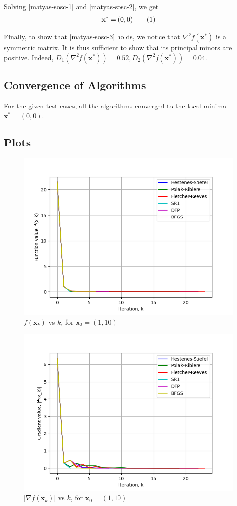 \documentclass[a4paper]{article}
\newcommand\numberthis{\addtocounter{equation}{1}\tag{\theequation}}
\begin{document}
Solving \eqref{matyas-sosc-1} and \eqref{matyas-sosc-2}, we get
\begin{align*}
    \textbf{x}^* = (0, 0) \numberthis \label{matyas-sosc-4}
\end{align*}

Finally, to show that \eqref{matyas-sosc-3} holds, we notice that $\nabla^2 f(\textbf{x}^*)$ is a symmetric matrix. It is thus sufficient to show that its principal minors are positive. Indeed, $D_1(\nabla^2 f(\textbf{x}^*)) = 0.52, D_2(\nabla^2 f(\textbf{x}^*)) = 0.04$.

\subsection{Convergence of Algorithms}

For the given test cases, all the algorithms converged to the local minima $\textbf{x}^* = (0, 0)$.

\subsection{Plots}

\begin{figure}[H]
    \centering
    \includegraphics[width=.65\textwidth]{matyas_function_vals.png}
    \caption{$f(\textbf{x}_k)$ vs $k$, for $\textbf{x}_0 = (1, 10)$}
\end{figure}

\begin{figure}[H]
    \centering
    \includegraphics[width=.65\textwidth]{matyas_function_grad.png}
    \caption{$|\nabla f(\textbf{x}_k)|$ vs $k$, for $\textbf{x}_0 = (1, 10)$}
\end{figure}
\end{document}
